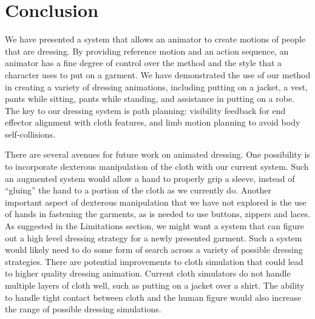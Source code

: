 \section{Conclusion}

We have presented a system that allows an animator to create motions of
people that are dressing.  By providing reference motion and an action
sequence, an animator has a fine degree of control over the method and the
style that a character uses to put on a garment.  We have demonstrated the
use of our method in creating a variety of dressing animations, including
putting on a jacket, a vest, pants while sitting, pants while standing,
and assistance in putting on a robe.  The key to our dressing system is
path planning: visibility feedback for end effector alignment with cloth
features, and limb motion planning to avoid body self-collisions.


There are several avenues for future work on animated dressing.  One
possibility is to incorporate dexterous manipulation of the cloth with our
current system.  Such an augmented system would allow a hand to properly
grip a sleeve, instead of ``gluing'' the hand to a portion of the cloth as
we currently do.  Another important aspect of dexterous manipulation that
we have not explored is the use of hands in fastening the garments, as is
needed to use buttons, zippers and laces.  As suggested in the Limitations
section, we might want a system that can figure out a high level dressing
strategy for a newly presented garment.  Such a system would likely need
to do some form of search across a variety of possible dressing
strategies.  There are potential improvements to cloth simulation that
could lead to higher quality dressing animation.  Current cloth simulators
do not handle multiple layers of cloth well, such as putting on a jacket
over a shirt.  The ability to handle tight contact between cloth and
the human figure would also increase the range of possible dressing
simulations.

